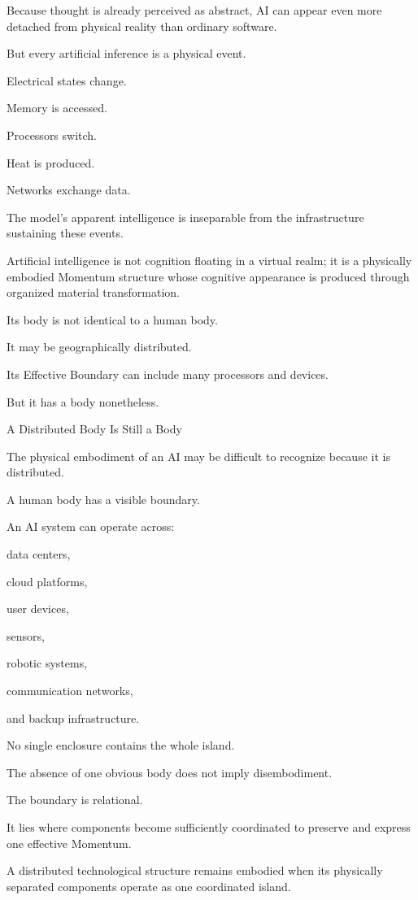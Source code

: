 Because thought is already perceived as abstract, AI can appear even more detached from physical reality than ordinary software.

But every artificial inference is a physical event.

Electrical states change.

Memory is accessed.

Processors switch.

Heat is produced.

Networks exchange data.

The model’s apparent intelligence is inseparable from the infrastructure sustaining these events.

Artificial intelligence is not cognition floating in a virtual realm; it is a physically embodied Momentum structure whose cognitive appearance is produced through organized material transformation.

Its body is not identical to a human body.

It may be geographically distributed.

Its Effective Boundary can include many processors and devices.

But it has a body nonetheless.

A Distributed Body Is Still a Body

The physical embodiment of an AI may be difficult to recognize because it is distributed.

A human body has a visible boundary.

An AI system can operate across:

data centers,

cloud platforms,

user devices,

sensors,

robotic systems,

communication networks,

and backup infrastructure.

No single enclosure contains the whole island.

The absence of one obvious body does not imply disembodiment.

The boundary is relational.

It lies where components become sufficiently coordinated to preserve and express one effective Momentum.

A distributed technological structure remains embodied when its physically separated components operate as one coordinated island.

